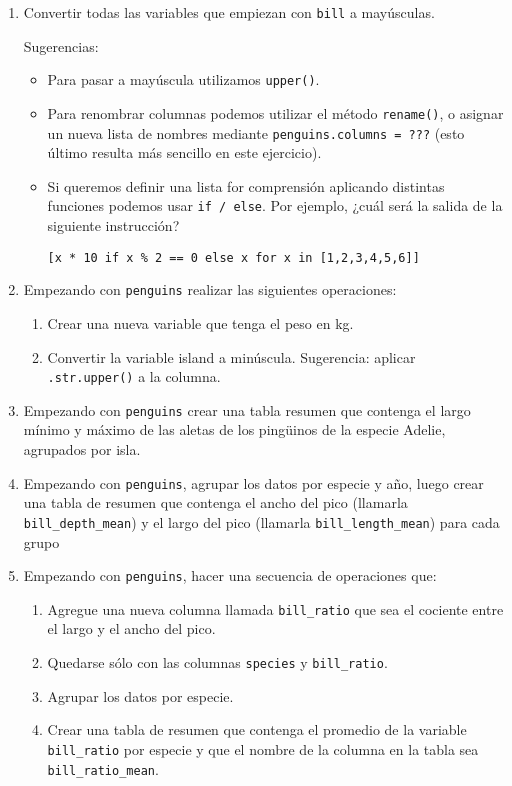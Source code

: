 \documentclass[a4paper,11pt]{article}
\theoremstyle{definition}
\begin{document}
\begin{enumerate}
\item Convertir todas las variables que empiezan con \lstinline{bill} a mayúsculas. 

Sugerencias:
\begin{itemize}
\item Para pasar a mayúscula utilizamos \lstinline{upper()}.
\item Para renombrar columnas podemos utilizar el método \lstinline{rename()}, o asignar un nueva lista de nombres mediante \lstinline{penguins.columns = ???} (esto último resulta más sencillo en este ejercicio).
\item Si queremos definir una lista for comprensión aplicando distintas funciones podemos usar \lstinline{if / else}. Por ejemplo, ¿cuál será la salida de la siguiente instrucción?

\lstinline{[x * 10 if x % 2 == 0 else x for x in [1,2,3,4,5,6]]}
\end{itemize}

\item Empezando con \lstinline{penguins} realizar las siguientes operaciones:
\begin{enumerate}
\item Crear una nueva variable que tenga el peso en kg.
\item Convertir la variable island a minúscula. Sugerencia: aplicar \lstinline{.str.upper()} a la columna.
\end{enumerate}

\item Empezando con \lstinline{penguins} crear una tabla resumen que contenga el largo mínimo y máximo de las aletas de los ping\"uinos de la especie Adelie, agrupados por isla.

\item Empezando con \lstinline{penguins}, agrupar los datos por especie y año, luego crear una tabla de resumen que contenga el ancho del pico (llamarla \lstinline{bill_depth_mean}) y el largo del pico (llamarla \lstinline{bill_length_mean}) para cada grupo

\item Empezando con \lstinline{penguins}, hacer una secuencia de operaciones que:
\begin{enumerate}
\item Agregue una nueva columna llamada \lstinline{bill_ratio} que sea el cociente entre el largo y el ancho del pico.
\item Quedarse sólo con las columnas \lstinline{species} y \lstinline{bill_ratio}.
\item Agrupar los datos por especie.
\item Crear una tabla de resumen que contenga el promedio de la variable \lstinline{bill_ratio} por especie y que el nombre de la columna en la tabla sea \lstinline{bill_ratio_mean}.
\end{enumerate}


\end{enumerate}
\end{document}
